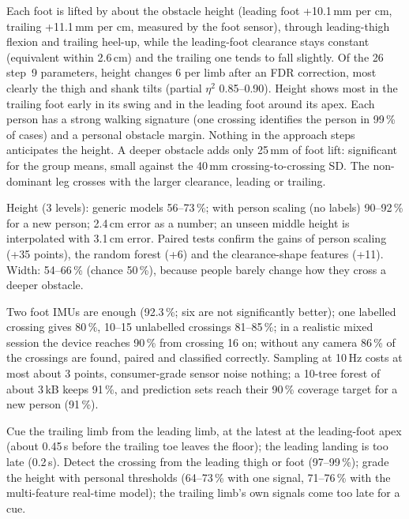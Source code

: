 \begin{keybox}
\begin{description}[leftmargin=0.3cm,style=nextline,itemsep=3pt]
  \item[Q1 How people cross] Each foot is lifted by about the obstacle height (leading foot +10.1\,mm per cm, trailing +11.1\,mm per cm,
  measured by the foot sensor), through leading-thigh flexion and trailing heel-up, while the leading-foot clearance stays constant
  (equivalent within 2.6\,cm) and the trailing one tends to fall slightly. Of the 26 step~9 parameters, height changes 6 per limb
  after an FDR correction, most clearly the thigh and shank tilts (partial $\eta^2$ 0.85--0.90). Height shows
  most in the trailing foot early in its swing and in the leading foot around its apex. Each person has a strong walking signature
  (one crossing identifies the person in 99\,\% of cases) and a personal obstacle margin. Nothing in the approach steps anticipates
  the height. A deeper obstacle adds only 25\,mm of foot lift: significant for the group means, small against the 40\,mm
  crossing-to-crossing SD. The non-dominant leg crosses with the larger clearance, leading or trailing.
  \item[Q2 Recognition] Height (3 levels): generic models 56--73\,\%; with person scaling (no labels) 90--92\,\% for a new person;
  2.4\,cm error as a number; an unseen middle height is interpolated with 3.1\,cm error. Paired tests confirm the gains of person
  scaling (+35 points), the random forest (+6) and the clearance-shape features (+11). Width: 54--66\,\% (chance 50\,\%),
  because people barely change how they cross a deeper obstacle.
  \item[Q3 Device] Two foot IMUs are enough (92.3\,\%; six are not significantly better); one labelled crossing gives 80\,\%,
  10--15 unlabelled crossings 81--85\,\%; in a realistic mixed session the device reaches 90\,\% from crossing 16 on; without any
  camera 86\,\% of the crossings are found, paired and classified correctly. Sampling at 10\,Hz costs at most about 3 points,
  consumer-grade sensor noise nothing; a 10-tree forest of about 3\,kB keeps 91\,\%, and prediction sets reach their 90\,\%
  coverage target for a new person (91\,\%).
  \item[Q4 Haptic cue] Cue the trailing limb from the leading limb, at the latest at the leading-foot apex (about 0.45\,s before the
  trailing toe leaves the floor); the leading landing is too late (0.2\,s). Detect the crossing from the leading thigh or foot
  (97--99\,\%); grade the height with personal thresholds (64--73\,\% with one signal, 71--76\,\% with the multi-feature real-time
  model); the trailing limb's own signals come too late for a cue.
\end{description}
\end{keybox}

